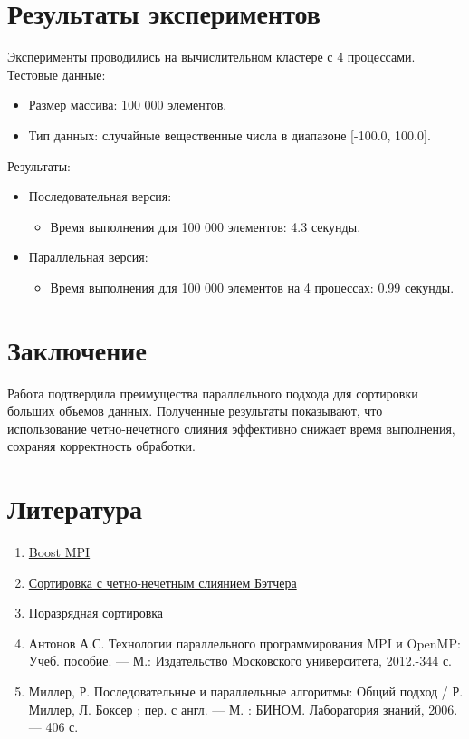 \documentclass[a4paper,12pt]{article}
\begin{document}
\newpage

\section*{\centering Результаты экспериментов}

Эксперименты проводились на вычислительном кластере с 4 процессами. Тестовые данные:
\begin{itemize}
    \item Размер массива: 100 000 элементов.
    \item Тип данных: случайные вещественные числа в диапазоне [-100.0, 100.0].
\end{itemize}

Результаты:
\begin{itemize}
    \item Последовательная версия:
    \begin{itemize}
        \item Время выполнения для 100 000 элементов: 4.3 секунды.
    \end{itemize}
    \item Параллельная версия:
    \begin{itemize}
        \item Время выполнения для 100 000 элементов на 4 процессах: 0.99 секунды.
    \end{itemize}
\end{itemize}

\newpage

\section*{\centering Заключение}

Работа подтвердила преимущества параллельного подхода для сортировки больших объемов данных. Полученные результаты показывают, что использование четно-нечетного слияния эффективно снижает время выполнения, сохраняя корректность обработки.

\newpage
\section*{\centering Литература}
\begin{enumerate}
    \item \href{https://www.boost.org/}{Boost MPI}
    \item \href{https://www.youtube.com/watch?v=BwHIu38PCCo}{Сортировка с четно-нечетным слиянием Бэтчера}
    \item \href{https://ru.wikipedia.org/wiki/%D0%9F%D0%BE%D1%80%D0%B0%D0%B7%D1%80%D1%8F%D0%B4%D0%BD%D0%B0%D1%8F_%D1%81%D0%BE%D1%80%D1%82%D0%B8%D1%80%D0%BE%D0%B2%D0%BA%D0%B0}{Поразрядная сортировка}
    \item Антонов А.С. Технологии параллельного программирования MPI и OpenMP: Учеб. пособие. — М.: Издательство Московского университета, 2012.-344 с.
    \item Миллер, Р. Последовательные и параллельные алгоритмы: Общий подход / Р. Миллер, Л. Боксер ; пер. с англ. — М. : БИНОМ. Лаборатория знаний, 2006. — 406 с.
\end{enumerate}
\end{document}
